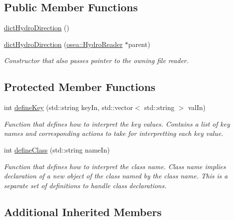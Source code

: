 \subsection*{Public Member Functions}
\begin{DoxyCompactItemize}
\item 
\hyperlink{classosea_1_1dict_hydro_direction_a4c4a831002dc530dfb4146b272075916}{dict\-Hydro\-Direction} ()
\item 
\hyperlink{classosea_1_1dict_hydro_direction_a97754a258412a9e90dc58228cb5d2947}{dict\-Hydro\-Direction} (\hyperlink{classosea_1_1_hydro_reader}{osea\-::\-Hydro\-Reader} $\ast$parent)
\begin{DoxyCompactList}\small\item\em Constructor that also passes pointer to the owning file reader. \end{DoxyCompactList}\end{DoxyCompactItemize}
\subsection*{Protected Member Functions}
\begin{DoxyCompactItemize}
\item 
int \hyperlink{classosea_1_1dict_hydro_direction_a7a9a906f8d1f453bf9bc41326141f07f}{define\-Key} (std\-::string key\-In, std\-::vector$<$ std\-::string $>$ val\-In)
\begin{DoxyCompactList}\small\item\em Function that defines how to interpret the key values. Contains a list of key names and corresponding actions to take for interpretting each key value. \end{DoxyCompactList}\item 
int \hyperlink{classosea_1_1dict_hydro_direction_a2df9310178b67dce0a040f024f107f91}{define\-Class} (std\-::string name\-In)
\begin{DoxyCompactList}\small\item\em Function that defines how to interpret the class name. Class name implies declaration of a new object of the class named by the class name. This is a separate set of definitions to handle class declarations. \end{DoxyCompactList}\end{DoxyCompactItemize}
\subsection*{Additional Inherited Members}


